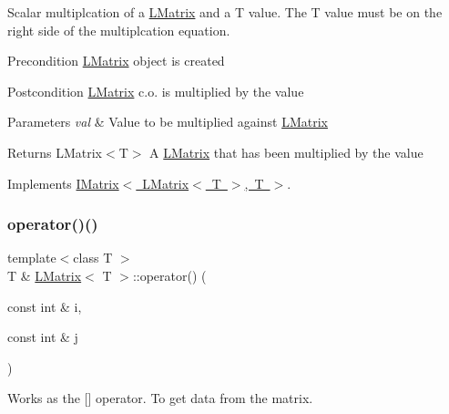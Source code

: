 Scalar multiplcation of a \mbox{\hyperlink{class_l_matrix}{L\+Matrix}} and a T value. The T value must be on the right side of the multiplcation equation. 

\begin{DoxyPrecond}{Precondition}
\mbox{\hyperlink{class_l_matrix}{L\+Matrix}} object is created 
\end{DoxyPrecond}
\begin{DoxyPostcond}{Postcondition}
\mbox{\hyperlink{class_l_matrix}{L\+Matrix}} c.\+o. is multiplied by the value 
\end{DoxyPostcond}

\begin{DoxyParams}{Parameters}
{\em val} & Value to be multiplied against \mbox{\hyperlink{class_l_matrix}{L\+Matrix}} \\
\hline
\end{DoxyParams}
\begin{DoxyReturn}{Returns}
L\+Matrix$<$\+T$>$ A \mbox{\hyperlink{class_l_matrix}{L\+Matrix}} that has been multiplied by the value 
\end{DoxyReturn}


Implements \mbox{\hyperlink{class_i_matrix_a10121e038635bdf33552c6a1fb288398}{I\+Matrix$<$ L\+Matrix$<$ T $>$, T $>$}}.

\mbox{\label{class_l_matrix_aa0b1bc37d56538dbdd4fcb3b88dcc3ec}} 
\subsubsection{\texorpdfstring{operator()()}{operator()()}\hspace{0.1cm}{\footnotesize\ttfamily [1/2]}}
{\footnotesize\ttfamily template$<$class T $>$ \\
T \& \mbox{\hyperlink{class_l_matrix}{L\+Matrix}}$<$ T $>$\+::operator() (\begin{DoxyParamCaption}\item[{const int \&}]{i,  }\item[{const int \&}]{j }\end{DoxyParamCaption})\hspace{0.3cm}{\ttfamily [virtual]}}



Works as the \mbox{[}\mbox{]} operator. To get data from the matrix. 

